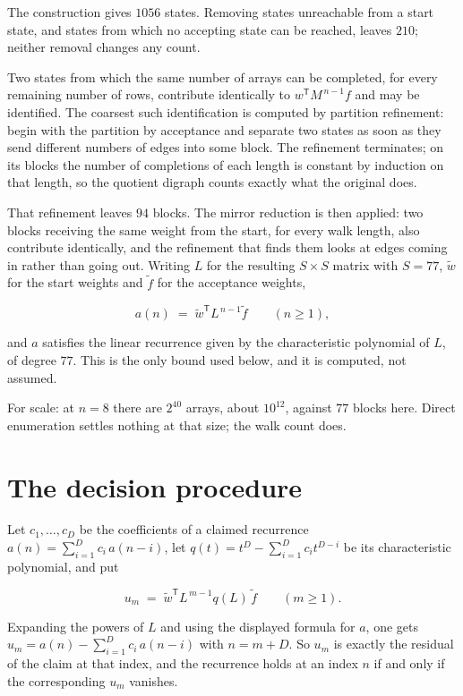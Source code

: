 \documentclass[11pt]{article}
\theoremstyle{definition}
\begin{document}
The construction gives $1056$ states. Removing states unreachable from a start state, and states from which no accepting state can be reached, leaves $210$; neither removal changes any count.

Two states from which the same number of arrays can be completed, for every remaining number of rows, contribute identically to $w^{\mathsf T}M^{\,n-1}f$ and may be identified. The coarsest such identification is computed by partition refinement: begin with the partition by acceptance and separate two states as soon as they send different numbers of edges into some block. The refinement terminates; on its blocks the number of completions of each length is constant by induction on that length, so the quotient digraph counts exactly what the original does.

That refinement leaves $94$ blocks. The mirror reduction is then applied: two blocks receiving the same weight from the start, for every walk length, also contribute identically, and the refinement that finds them looks at edges coming in rather than going out. Writing $L$ for the resulting $S \times S$ matrix with $S = 77$, $\tilde w$ for the start weights and $\tilde f$ for the acceptance weights,

\[a(n) \;=\; \tilde w^{\mathsf T} L^{\,n-1} \tilde f \qquad (n \ge 1),\]

and $a$ satisfies the linear recurrence given by the characteristic polynomial of $L$, of degree $77$. This is the only bound used below, and it is computed, not assumed.

For scale: at $n = 8$ there are $2^{40}$ arrays, about $10^{12}$, against $77$ blocks here. Direct enumeration settles nothing at that size; the walk count does.

\section{The decision procedure}

Let $c_1,\dots,c_D$ be the coefficients of a claimed recurrence $a(n) = \sum_{i=1}^{D} c_i\,a(n-i)$, let $q(t) = t^{D} - \sum_{i=1}^{D} c_i t^{D-i}$ be its characteristic polynomial, and put

\[u_m \;=\; \tilde w^{\mathsf T} L^{\,m-1} q(L)\,\tilde f \qquad (m \ge 1).\]

Expanding the powers of $L$ and using the displayed formula for $a$, one gets $u_m = a(n) - \sum_{i=1}^{D} c_i\,a(n-i)$ with $n = m + D$. So $u_m$ is exactly the residual of the claim at that index, and the recurrence holds at an index $n$ if and only if the corresponding $u_m$ vanishes.
\end{document}
